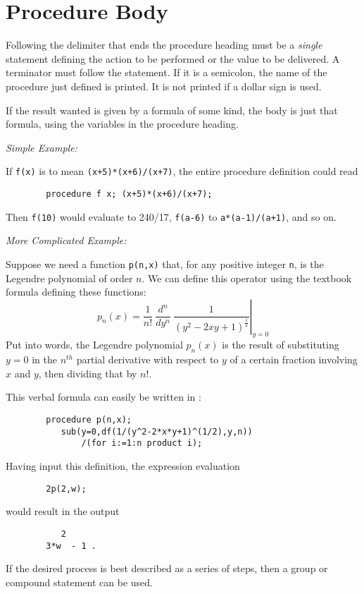 \section{Procedure Body}

Following the delimiter that ends the procedure heading must be a
\emph{single} statement defining the action to be performed or the value to be
delivered.  A terminator must follow the statement.  If it is a semicolon,
the name of the procedure just defined is printed.  It is not printed if a
dollar sign is used.

If the result wanted is given by a formula of some kind, the body is just
that formula, using the variables in the procedure heading.

\textit{Simple Example:}

If \texttt{f(x)} is to mean \texttt{(x+5)*(x+6)/(x+7)}, the entire procedure
definition could read
\begin{verbatim}
        procedure f x; (x+5)*(x+6)/(x+7);
\end{verbatim}
Then \texttt{f(10)} would evaluate to 240/17, \texttt{f(a-6)} to
\texttt{a*(a-1)/(a+1)}, and so on.

\textit{More Complicated Example:}

Suppose we need a function \texttt{p(n,x)} that, for any positive integer
\texttt{n}, is the Legendre polynomial of order
$n$. We can define this operator using the
textbook formula defining these functions:
\[
p_n(x) = \left.\frac{1}{n!}\
\frac{{d}^n}{dy^n}\ \frac{1}{{(y^2 - 2xy + 1)}^{\frac{1}{2}}}\right\vert_{y=0}
\]
Put into words, the Legendre polynomial $p_n(x)$ is the result of
substituting $y=0$ in the $n^{th}$ partial derivative with respect to $y$
of a certain fraction involving $x$ and $y$, then dividing that by $n!$.

This verbal formula can easily be written in {\REDUCE}:
\begin{verbatim}
        procedure p(n,x);
           sub(y=0,df(1/(y^2-2*x*y+1)^(1/2),y,n))
               /(for i:=1:n product i);
\end{verbatim}
Having input this definition, the expression evaluation
\begin{verbatim}
        2p(2,w);
\end{verbatim}
would result in the output
\begin{verbatim}
           2
        3*w  - 1 .
\end{verbatim}
If the desired process is best described as a series of steps, then a group
or compound statement can be used.

